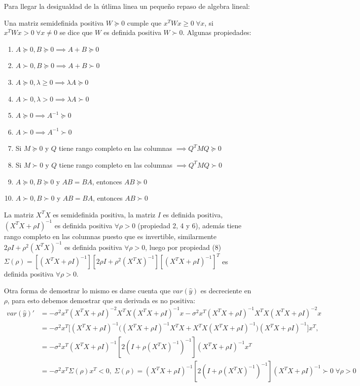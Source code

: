 \documentclass[11pt,letterpaper]{article}
\begin{document}
\begin{itemize}
	Para llegar la desigualdad de la útlima linea un pequeño repaso de algebra lineal:
	
	Una matriz semidefinida positiva $W \succeq 0$ cumple que $x^{T}Wx\geq0 \; \forall x$, si $x^{T}Wx>0 \; \forall x \neq 0$ se dice que $W$ es definida positiva $W \succ 0$. Algunas propiedades:
	
	\begin{enumerate}
	     \item $A\succeq 0, B\succeq 0 \implies  A+B\succeq 0$
	     \item $A\succ 0, B\succeq 0 \implies  A+B\succ 0$
	     \item $A\succeq 0, \lambda\geq0 \implies  \lambda A \succeq 0$
	     \item $A\succ 0, \lambda>0\implies  \lambda A \succ 0$
	     \item $A\succeq 0 \implies A^{-1}\succeq 0 $
	     \item $A\succ 0 \implies A^{-1}\succ 0 $
	     \item Si $M\succeq0$ y $Q$ tiene rango completo en las columnas $\implies Q^{T}MQ\succeq0$
 	     \item Si $M\succ0$ y $Q$ tiene rango completo en las columnas $\implies Q^{T}MQ\succ0$
 	     \item $A\succeq 0, B\succeq 0$ y $AB=BA$, entonces $AB\succeq0$
 	     \item $A\succ 0, B\succ 0$ y $AB=BA$, entonces $AB\succ0$
	\end{enumerate}
	
	La matriz $X^{T}X$ es semidefinida positiva, la matriz $I$ es definida positiva, $(X^{T}X+\rho I)^{-1}$ es definida positiva $\forall \rho>0$ (propiedad 2, 4 y 6), además  tiene rango completo en las columnas puesto que es invertible, similarmente $2\rho I+\rho^{2}(X^{T}X)^{-1}$ es definida positiva $\forall \rho>0$, luego por propiedad (8) $\Sigma(\rho)=[(X^{T}X+\rho I)^{-1}][2\rho I+\rho^{2}(X^{T}X)^{-1}][(X^{T}X+\rho I)^{-1}]^{T}$ es definida positiva $\forall \rho>0$. 
	
Otra forma de demostrar lo mismo es darse cuenta que $var(\hat{y})$ es decreciente en $\rho$, para esto debemos demostrar que su derivada es no positiva:\\

\begin{align*}
var(\hat{y})' & = -\sigma^{2}x^{T}(X^{T}X+\rho I)^{-2}X^{T}X(X^{T}X+\rho I)^{-1}x-\sigma^{2}x^{T}(X^{T}X+\rho I)^{-1}X^{T}X(X^{T}X+\rho I)^{-2}x\\
& = -\sigma^{2}x^{T}\big[(X^{T}X+\rho I)^{-1}\big((X^{T}X+\rho I)^{-1}X^{T}X+X^{T}X(X^{T}X+\rho I)^{-1}\big)(X^{T}X+\rho I)^{-1}\big]x^{T},\\
& = -\sigma^{2}x^{T}(X^{T}X+\rho I)^{-1}[2(I+\rho(X^{T}X)^{-1})^{-1}](X^{T}X+\rho I)^{-1}x^{T}\\
& =  -\sigma^{2}x^{T}\Sigma(\rho)x^{T} < 0, \; \Sigma(\rho)= (X^{T}X+\rho I)^{-1}[2(I+\rho(X^{T}X)^{-1})^{-1}](X^{T}X+\rho I)^{-1} \succ 0 \; \forall \rho >0
\end{align*}


\end{itemize}
\end{document}
